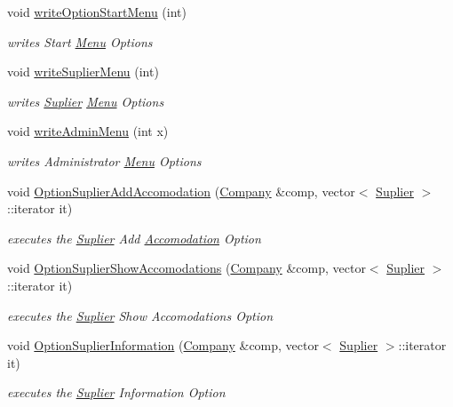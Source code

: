 \begin{DoxyCompactItemize}
void \hyperlink{class_menu_acc70f0214e040f8efae051c01f523994}{write\+Option\+Start\+Menu} (int)
\begin{DoxyCompactList}\small\item\em writes Start \hyperlink{class_menu}{Menu} Options \end{DoxyCompactList}\item 
void \hyperlink{class_menu_a334f5dc94dfbf43d56aa4c3a94cf8f11}{write\+Suplier\+Menu} (int)
\begin{DoxyCompactList}\small\item\em writes \hyperlink{class_suplier}{Suplier} \hyperlink{class_menu}{Menu} Options \end{DoxyCompactList}\item 
void \hyperlink{class_menu_a604dde8d1682c7a528e53e8a4304297c}{write\+Admin\+Menu} (int x)
\begin{DoxyCompactList}\small\item\em writes Administrator \hyperlink{class_menu}{Menu} Options \end{DoxyCompactList}\item 
void \hyperlink{class_menu_a5a206bd2b3e8dfa47b2526454489a223}{Option\+Suplier\+Add\+Accomodation} (\hyperlink{class_company}{Company} \&comp, vector$<$ \hyperlink{class_suplier}{Suplier} $>$\+::iterator it)
\begin{DoxyCompactList}\small\item\em executes the \hyperlink{class_suplier}{Suplier} Add \hyperlink{class_accomodation}{Accomodation} Option \end{DoxyCompactList}\item 
void \hyperlink{class_menu_acd1b717ce9b7e5d2f65d5d6ac64b1513}{Option\+Suplier\+Show\+Accomodations} (\hyperlink{class_company}{Company} \&comp, vector$<$ \hyperlink{class_suplier}{Suplier} $>$\+::iterator it)
\begin{DoxyCompactList}\small\item\em executes the \hyperlink{class_suplier}{Suplier} Show Accomodations Option \end{DoxyCompactList}\item 
void \hyperlink{class_menu_a8b970a2863470d8d06918ad582522371}{Option\+Suplier\+Information} (\hyperlink{class_company}{Company} \&comp, vector$<$ \hyperlink{class_suplier}{Suplier} $>$\+::iterator it)
\begin{DoxyCompactList}\small\item\em executes the \hyperlink{class_suplier}{Suplier} Information Option \end{DoxyCompactList}\item 

\end{DoxyCompactItemize}
